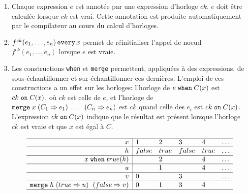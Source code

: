 \documentclass[a4paper]{article}
\newcommand{\mybox}[1]{\mbox{\tt{#1}}}
\newcommand{\Every}[4]{#1^{ck}(#2,\dots,#3) \, \mybox{every} \, #4}
\newcommand{\When}[3]{#1 \; \mybox{when} \; #2(#3)}
\newcommand{\Merge}[5]{\mybox{merge} \; #1 \; (#2 \Rightarrow #3) \; \dots \; \
  (#4 \Rightarrow #5)}
\newcommand{\Merges}[5]{\mybox{merge} \; #1 \; (#2 \Rightarrow #3) \; \
  (#4 \Rightarrow #5)}
\newcommand{\On}[3]{#1 \; \mybox{on} \; #2 (#3)}
\begin{document}
\begin{enumerate}
\item Chaque expression $e$ est annot\'ee par une expression d'horloge
  $ck$. $e$ doit \^etre calcul\'ee lorsque $ck$ est vrai. Cette annotation
  est produite automatiquement par le compilateur au cours du calcul
  d'horloges.
\item $\Every{f}{e_1}{e_n}{x}$ permet de r\'einitialiser l'appel de
  noeud $f^{ck}(e_1,...,e_n)$ lorsque $e$ est vraie.
\item




  Les constructions \texttt{when} et \texttt{merge} permettent,
  appliqu\'ees \`a des expressions, de sous-\'echantillon\-ner et
  sur-\'echantillonner ces derni\`eres. L'emploi de ces constructions a un
  effet sur les horloges: l'horloge de $\When{e}{C}{x}$ est
  $\On{ck}{C}{x}$, o\`u $ck$ est celle de $e$, et l'horloge de
  $\Merge{x}{C_1}{e_1}{C_n}{e_n}$ est $ck$ quand celle des $e_i$ est
  $\On{ck}{C}{x}$. L'expression $\On{ck}{C}{x}$ indique que le
  r\'esultat est pr\'esent lorsque l'horloge $ck$ est vraie et que $x$ est
  \'egal \`a $C$.

\[
\begin{array}{r|llllllllllllllllllllllllllll}
  \hline
  x & 1 & 2 & 3 & 4 & \dots \\
  \hline
  h & false & true & false & true & \dots \\
  \hline
  \When{x}{true}{h} & & 2 & & 4 & \dots \\
  \hline
  u &  & 1 & & 4 & \dots \\
  \hline
  v & 0 & & 3 & & \dots \\
  \hline
  \Merges{h}{true}{u}{false}{v} & 0 & 1 & 3 & 4 \\
  \hline
\end{array}
\]


\end{enumerate}
\end{document}
